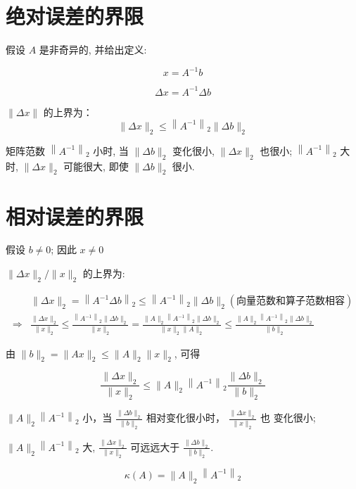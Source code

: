 \section{绝对误差的界限}

假设 $ A $ 是非奇异的, 并给出定义:

\begin{notation}
    $$ x=A^{-1} b$$ 
    
    $$ \Delta x=A^{-1} \Delta b $$
\end{notation}

$ \|\Delta x\| $ 的上界为：
$$
\|\Delta x\|_{2} \leq\left\|A^{-1}\right\|_{2}\|\Delta b\|_{2}
$$

矩阵范数 $ \left\|A^{-1}\right\|_{2} $ 小时, 当 $ \|\Delta b\|_{2} $ 变化很小, $ \|\Delta x\|_{2} $ 也很小; $ \left\|A^{-1}\right\|_{2} $ 大时,  $ \|\Delta x\|_{2} $ 可能很大,  即使 $ \|\Delta b\|_{2} $ 很小. 

\section{相对误差的界限}

假设 $ b \neq 0 $; 因此 $ x \neq 0$

$\|\Delta x\|_{2} /\|x\|_{2} $ 的上界为:

$$ 
\begin{aligned}
    &\|\Delta x\|_{2}=\left\|A^{-1} \Delta b\right\|_{2} \leq\left\|A^{-1}\right\|_{2}\|\Delta b\|_{2}(向量范数和算子范数相容)\\
    \Rightarrow& \frac{\|\Delta x\|_{2}}{\|x\|_{2}} \leq \frac{\left\|A^{-1}\right\|_{2}\|\Delta b\|_{2}}{\|x\|_{2}}=\frac{\|A\|_{2}\left\|A^{-1}\right\|_{2}\|\Delta b\|_{2}}{\|x\|_{2}\|A\|_{2}} \leq \frac{\|A\|_{2}\left\|A^{-1}\right\|_{2}\|\Delta b\|_{2}}{\|b\|_{2}}
\end{aligned}
$$

由 $ \|b\|_{2}=\|A x\|_{2} \leq\|A\|_{2}\|x\|_{2} $, 可得

$$ \frac{\|\Delta x\|_{2}}{\|x\|_{2}} \leq\|A\|_{2}\left\|A^{-1}\right\|_{2} \frac{\|\Delta b\|_{2}}{\|b\|_{2}} $$

$ \|A\|_{2}\left\|A^{-1}\right\|_{2} $ 小，当 $ \frac{\|\Delta b\|_{2}}{\|b\|_{2}}  $ 相对变化很小时， $ \frac{\|\Delta x\|_{2}}{\|x\|_{2}}  $ 也 变化很小;

$ \|A\|_{2}\left\|A^{-1}\right\|_{2} $ 大, $ \frac{\|\Delta x\|_{2}}{\|x\|_{2}}  $ 可远远大于 $ \frac{\|\Delta b\|_{2}}{\|b\|_{2}}  $.


\begin{definition}
    $$ \kappa(A)=\|A\|_{2}\left\|A^{-1}\right\|_{2} $$
\end{definition}

